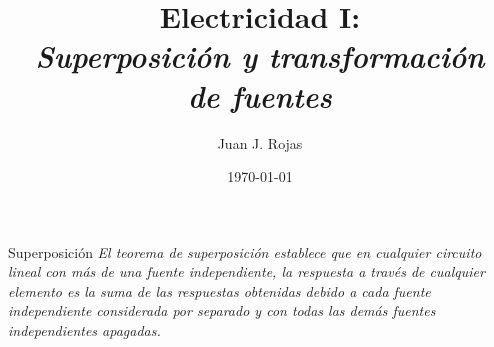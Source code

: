 \documentclass[aspectratio=169]{beamer}
\title{Electricidad I: \\ \emph{Superposición y transformación} \\ \emph{de fuentes}}
\author{
    Juan J. Rojas
}
\institute{Instituto Tecnológico de Costa Rica}
\date{\today}
\begin{document}

\maketitle

\begin{frame}{Superposición}
\emph{El teorema de superposición establece que en cualquier circuito lineal con más de una fuente independiente, la respuesta a través de cualquier elemento es la suma de las respuestas obtenidas debido a cada fuente independiente considerada por separado y con todas las demás fuentes independientes apagadas.}
\end{frame}
\end{document}
